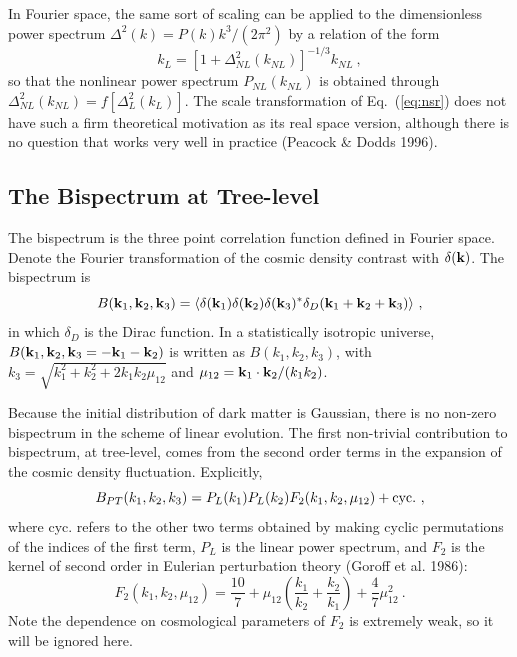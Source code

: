 \documentclass[]{mn2e}
\begin{document}
In Fourier space, the same sort of scaling can be applied to the
dimensionless power spectrum $\Delta^2(k)=P(k)k^3/(2\pi^2)$ by a
relation of the form
\begin{equation}
k_L=\left[1+\Delta_{NL}^2(k_{NL}) \right]^{-1/3} k_{NL} \ ,
\label{eq:nsr}
\end{equation}
so that the nonlinear power spectrum $P_{NL}(k_{NL})$ is obtained
through $\Delta^2_{NL}(k_{NL})=f\left[ \Delta^2_L(k_L)\right]$. The
scale transformation of Eq.~(\ref{eq:nsr}) does not have such a firm
theoretical motivation as its real space version, although there is
no question that works very well in practice (Peacock \& Dodds
1996).

\subsection{The Bispectrum at Tree-level}
The bispectrum is the three point correlation function defined in
Fourier space. Denote the Fourier transformation of the cosmic
density contrast with $\delta({\bf k})$. The bispectrum is
\begin{equation}
B({\bf k}_1, {\bf k}_2, {\bf k}_3)=\langle \delta({\bf
k}_1)\delta({\bf k}_2)\delta({\bf k}_3)^* \delta_D({\bf k}_1+{\bf
k}_2+{\bf k}_3) \rangle \ ,
\end{equation}
in which $\delta_D$ is the Dirac function. In a statistically
isotropic universe, $B({\bf k}_1, {\bf k}_2, {\bf k}_3=-{\bf
k}_1-{\bf k}_2)$ is written as $B(k_1, k_2, k_3)$, with
$k_3=\sqrt{k_1^2+k_2^2+2 k_1 k_2 \mu_{12}}$ and $\mu_{12}={\bf k}_1
\cdot {\bf k}_2/(k_1 k_2)$.

Because the initial distribution of dark matter is Gaussian, there
is no non-zero bispectrum in the scheme of linear evolution. The
first non-trivial contribution to bispectrum, at tree-level, comes
from the second order terms in the expansion of the cosmic density
fluctuation. Explicitly,
\begin{equation}
B_{PT}(k_1, k_2, k_3)=P_L(k_1)P_L(k_2) F_2(k_1, k_2, \mu_{12}) +
{\rm cyc.} \ ,
\end{equation}
where {\rm cyc.} refers to the other two terms obtained by making
cyclic permutations of the indices of the first term, $P_L$ is the
linear power spectrum, and $F_2$ is the kernel of second order in
Eulerian perturbation theory (Goroff et al. 1986):
\begin{equation}
F_2(k_1, k_2, \mu_{12})=\frac{10}{7}+\mu_{12}\left( \frac{k_1}{k_2}+\frac{k_2}{k_1} \right)
+\frac{4}{7}\mu_{12}^2\ .
\end{equation}
Note the dependence on cosmological parameters of $F_2$ is extremely
weak, so it will be ignored here.
\end{document}
